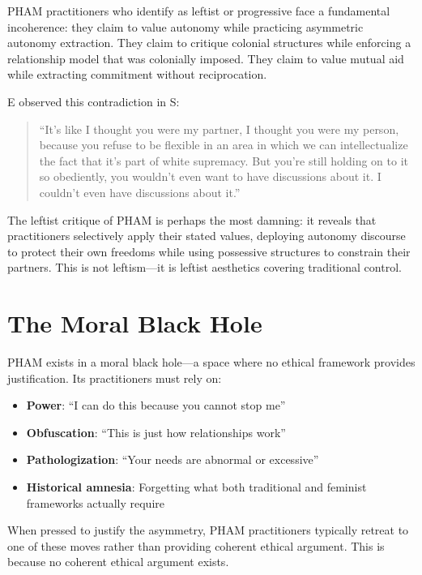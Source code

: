 \documentclass[12pt,openany]{book}
\numberwithin{equation}{chapter}
\begin{document}
PHAM practitioners who identify as leftist or progressive face a fundamental incoherence: they claim to value autonomy while practicing asymmetric autonomy extraction. They claim to critique colonial structures while enforcing a relationship model that was colonially imposed. They claim to value mutual aid while extracting commitment without reciprocation.

E observed this contradiction in S:

\begin{quote}
``It's like I thought you were my partner, I thought you were my person, because you refuse to be flexible in an area in which we can intellectualize the fact that it's part of white supremacy. But you're still holding on to it so obediently, you wouldn't even want to have discussions about it. I couldn't even have discussions about it.''
\end{quote}

The leftist critique of PHAM is perhaps the most damning: it reveals that practitioners selectively apply their stated values, deploying autonomy discourse to protect their own freedoms while using possessive structures to constrain their partners. This is not leftism---it is leftist aesthetics covering traditional control.

\section{The Moral Black Hole}

PHAM exists in a moral black hole---a space where no ethical framework provides justification. Its practitioners must rely on:

\begin{itemize}
    \item \textbf{Power}: ``I can do this because you cannot stop me''
    \item \textbf{Obfuscation}: ``This is just how relationships work''
    \item \textbf{Pathologization}: ``Your needs are abnormal or excessive''
    \item \textbf{Historical amnesia}: Forgetting what both traditional and feminist frameworks actually require
\end{itemize}

When pressed to justify the asymmetry, PHAM practitioners typically retreat to one of these moves rather than providing coherent ethical argument. This is because no coherent ethical argument exists.
\end{document}
